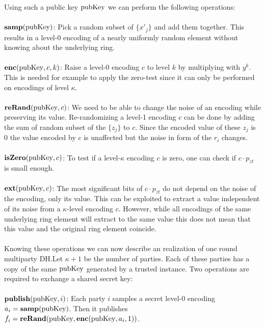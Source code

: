 \documentclass[english]{scrartcl}
\theoremstyle{plain}
\theoremstyle{definition}
\begin{document}
    Using such a public key $\mathrm{pubKey}$ we can perform the following operations:
    \\\\
    $\mathbf{samp}(\mathrm{pubKey})$: Pick a random subset of $\{x'_j\}$ and add them together. This results in a level-0 encoding of a nearly uniformly random element without knowing about the underlying ring.
    \\\\
    $\mathbf{enc}(\mathrm{pubKey}, c, k)$: Raise a level-0 encoding $c$ to level $k$ by multiplying with $y^k$. This is needed for example to apply the zero-test since it can only be performed on encodings of level $\kappa$.
    \\\\
    $\mathbf{reRand}(\mathrm{pubKey}, c)$: We need to be able to change the noise of an encoding while preserving its value. Re-randomizing a level-1 encoding $c$ can be done by adding the sum of random subset of the $\{z_j\}$ to $c$. Since the encoded value of these $z_j$ is 0 the value encoded by $c$ is unaffected but the noise in form of the $r_i$ changes.
    \\\\
    $\mathbf{isZero}(\mathrm{pubKey}, c)$: To test if a level-$\kappa$ encoding $c$ is zero, one can check if $c \cdot p_{zt}$ is small enough.
    \\\\
    $\mathbf{ext}(\mathrm{pubKey}, c)$: The most significant bits of $c \cdot p_{zt}$ do not depend on the noise of the encoding, only its value. This can be exploited to extract a value independent of its noise from a $\kappa$-level encoding $c$. However, while all encodings of the same underlying ring element will extract to the same value this does not mean that this value and the original ring element coincide.
    \\\\
    Knowing these operations we can now describe an realization of one round multiparty DH.\@ Let $\kappa + 1$ be the number of parties. Each of these parties has a copy of the same $\mathrm{pubKey}$ generated by a trusted instance. Two operations are required to exchange a shared secret key:
    \\\\
    $\mathbf{publish}(\mathrm{pubKey}, i)$: Each party $i$ samples a secret level-0 encoding $a_i = \mathbf{samp}(\mathrm{pubKey})$.
    Then it publishes $f_i = \mathbf{reRand}(\mathrm{pubKey}, \mathbf{enc}(\mathrm{pubKey}, a_i, 1))$.
    \\\\
\end{document}
